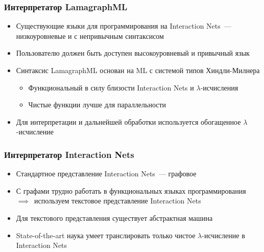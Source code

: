 \documentclass[aspectratio=169]{beamer}
\begin{document}
\begin{frame}
    \frametitle{Интерпретатор LamagraphML}

    \begin{itemize}
        \item Существующие языки для программирования на Interaction Nets~--- низкоуровневые и с непривычным синтаксисом
        \item Пользователю должен быть доступен высокоуровневый и привычный язык
        \item Синтаксис LamagraphML основан на ML с системой типов Хиндли-Милнера
              \begin{itemize}
                  \item Функциональный в силу близости Interaction Nets и $\lambda$-исчисления
                  \item Чистые функции лучше для параллельности
              \end{itemize}
        \item[{\faLightbulb[regular]}] Для интерпретации и дальнейшей обработки используется обогащенное $\lambda$-исчисление
    \end{itemize}
\end{frame}

\begin{frame}
    \frametitle{Интерпретатор Interaction Nets}

    \begin{itemize}
        \item Стандартное представление Interaction Nets~--- графовое
        \item С графами трудно работать в функциональных языках программирования $\implies$~используем текстовое представление Interaction Nets
        \item Для текстового представления существует абстрактная машина
        \item[{\faFrown[regular]}] State-of-the-art наука умеет транслировать только чистое $\lambda$-исчисление в Interaction Nets
    \end{itemize}

\end{frame}
\end{document}
